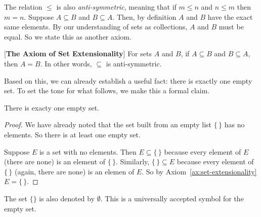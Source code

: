 The relation $\leq$ is also \emph{anti-symmetric}, meaning that if $m\leq n$ and $n\leq m$ then $m=n$. 
Suppose $A\subseteq B$ and $B\subseteq A$. Then, by definition $A$ and $B$ have the exact same elements.  By our understanding of sets as collections,
$A$ and $B$ must be equal. So we state this as another axiom.

\begin{axiom}\label{ax:set-extensionality}
[\textbf{The Axiom of Set Extensionality}]
For sets $A$ and $B$, if $A\subseteq B$ and $B\subseteq A$, then $A=B$. In other words, $\subseteq$ is anti-symmetric.
\end{axiom}

Based on this, we can already establish a useful fact: there is exactly one empty set. To set the tone for what follows, we make this a formal claim.

\begin{lemma}
	There is exacty one empty set.
\begin{proof}
	We have already noted that the set built from an empty list $\{\,\}$ has no elements. So there is at least one empty set.
	
	Suppose $E$ is a set with no elements. Then $E\subseteq \{\,\}$ because every element of $E$ (there are none) is an element of $\{\,\}$. Similarly, $\{\,\}\subseteq E$ because every element of $\{\,\}$ (again, there are none) is an elemen of $E$. So by Axiom~\ref{ax:set-extensionality} $E = \{\,\}$.
\end{proof}
\end{lemma}

\begin{defn}
  The set $\{\}$ is also denoted by $\emptyset$. This is a universally accepted symbol for the empty set.
\end{defn}

